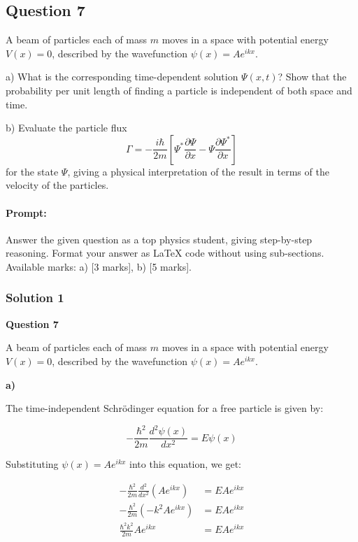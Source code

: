 \documentclass{article}
\begin{document}
\subsection{Question 7}
A beam of particles each of mass $m$ moves in a space with potential energy $V(x) = 0$, described by the wavefunction $\psi(x) = A e^{ikx}$.  

a) What is the corresponding time-dependent solution $\Psi(x,t)$? Show that the probability per unit length of finding a particle is independent of both space and time.  

b) Evaluate the particle flux  
\[
\Gamma = -\frac{i \hbar}{2m} \left[ \Psi^* \frac{\partial \Psi}{\partial x} - \Psi \frac{\partial \Psi^*}{\partial x} \right]
\]
for the state $\Psi$, giving a physical interpretation of the result in terms of the velocity of the particles.


\paragraph{Prompt: \\} 
Answer the given question as a top physics student, giving step-by-step reasoning. Format your answer as LaTeX code without using sub-sections. Available marks: a) [3 marks], b) [5 marks].


\subsubsection{Solution 1}
\textbf{Question 7}

A beam of particles each of mass $m$ moves in a space with potential energy $V(x) = 0$, described by the wavefunction $\psi(x) = Ae^{ikx}$.

\textbf{a)} 

The time-independent Schrödinger equation for a free particle is given by:

\begin{equation*}
-\frac{\hbar^2}{2m} \frac{d^2 \psi(x)}{dx^2} = E \psi(x)
\end{equation*}

Substituting $\psi(x) = Ae^{ikx}$ into this equation, we get:

\begin{align*}
-\frac{\hbar^2}{2m} \frac{d^2}{dx^2} (Ae^{ikx}) &= E Ae^{ikx} \\
-\frac{\hbar^2}{2m} (-k^2 Ae^{ikx}) &= E Ae^{ikx} \\
\frac{\hbar^2 k^2}{2m} Ae^{ikx} &= E Ae^{ikx}
\end{align*}
\end{document}
